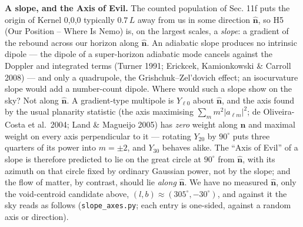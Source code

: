 \documentclass[
  11pt,
]{article}
\begin{document}
\textbf{A slope, and the Axis of Evil.} The counted population of Sec.
11f puts the origin of Kernel 0,0,0 typically \(0.7\,L\) away from us in
some direction \(\hat{\mathbf n}\), so H5 (Our Position -- Where Is
Nemo) is, on the largest scales, a \emph{slope}: a gradient of the
rebound across our horizon along \(\hat{\mathbf n}\). An adiabatic slope
produces no intrinsic dipole --- the dipole of a super-horizon adiabatic
mode cancels against the Doppler and integrated terms (Turner 1991;
Erickcek, Kamionkowski \& Carroll 2008) --- and only a quadrupole, the
Grishchuk--Zel'dovich effect; an isocurvature slope would add a
number-count dipole. Where would such a slope show on the sky? Not along
\(\hat{\mathbf n}\). A gradient-type multipole is \(Y_{\ell 0}\) about
\(\hat{\mathbf n}\), and the axis found by the usual planarity statistic
(the axis maximising \(\sum_m m^2 |a_{\ell m}|^2\); de Oliveira-Costa et
al.~2004; Land \& Magueijo 2005) has \emph{zero} weight along
\(\hat{\mathbf n}\) and maximal weight on every axis perpendicular to it
--- rotating \(Y_{20}\) by \(90^\circ\) puts three quarters of its power
into \(m = \pm 2\), and \(Y_{30}\) behaves alike. The ``Axis of Evil''
of a slope is therefore predicted to lie on the great circle at
\(90^\circ\) from \(\hat{\mathbf n}\), with its azimuth on that circle
fixed by ordinary Gaussian power, not by the slope; and the flow of
matter, by contrast, should lie \emph{along} \(\hat{\mathbf n}\). We
have no measured \(\hat{\mathbf n}\), only the void-centroid candidate
above, \((l,b) \approx (305^\circ, -30^\circ)\), and against it the sky
reads as follows (\texttt{slope\_axes.py}; each entry is one-sided,
against a random axis or direction).
\end{document}
